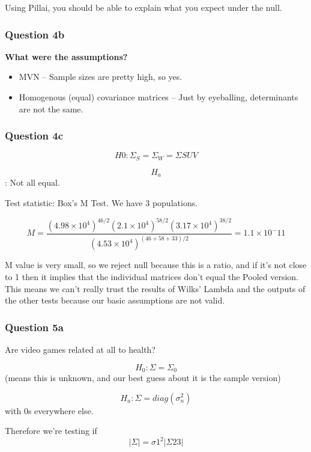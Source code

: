 \documentclass[]{article}
\providecommand{\tightlist}{%
  \setlength{\itemsep}{0pt}\setlength{\parskip}{0pt}}
\begin{document}
Using Pillai, you should be able to explain what you expect under the
null.

\hypertarget{question-4b}{%
\subsubsection{Question 4b}\label{question-4b}}

\textbf{What were the assumptions?}

\begin{itemize}
\tightlist
\item
  MVN -- Sample sizes are pretty high, so yes.
\item
  Homogenous (equal) covariance matrices -- Just by eyeballing,
  determinants are not the same.
\end{itemize}

\hypertarget{question-4c}{%
\subsubsection{Question 4c}\label{question-4c}}

\[H0: \Sigma_S = \Sigma_W = \Sigma{SUV}\]

\[H_a\]: Not all equal.

Test statistic: Box's M Test. We have 3 populations.

\[M = \frac{(4.98 \times 10^4)^{46/2}(2.1 \times 10^4)^{58/2}(3.17 \times 10^4)^{38/2}}{(4.53 \times 10^4)^{(46+58+33)/2}} = 1.1 \times 10^-11\]

M value is very small, so we reject null because this is a ratio, and if
it's not close to 1 then it implies that the individual matrices don't
equal the Pooled version. This means we can't really trust the results
of Wilks' Lambda and the outputs of the other tests because our basic
assumptions are not valid.

\hypertarget{question-5a}{%
\subsubsection{Question 5a}\label{question-5a}}

Are video games related at all to health?

\[H_0: \Sigma = \Sigma_0 \] (means this is unknown, and our best guess
about it is the sample version)

\[H_a: \Sigma = diag(\sigma_n^2) \] with 0s everywhere else.

Therefore we're testing if \[ | \Sigma | = \sigma1^2 | \Sigma{23} | \]
\end{document}
